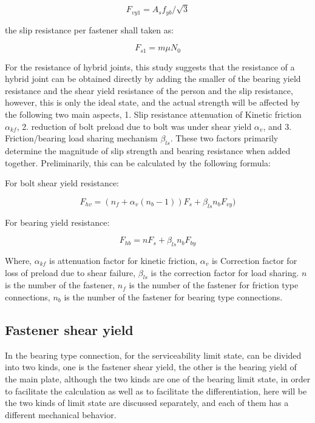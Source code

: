 \begin{equation}
    F_{vy1} = A_s f_{yb}/\sqrt{3}
\end{equation}

the slip resistance per fastener shall taken as:

\begin{equation}
    F_{s1} = m \mu N_0
\end{equation}


For the resistance of hybrid joints, this study suggests that the resistance of a hybrid joint can be obtained directly by adding the smaller of the bearing yield resistance and the shear yield resistance of the person and the slip resistance, however, this is only the ideal state, and the actual strength will be affected by the following two main aspects, 1. Slip resistance attenuation of Kinetic friction $\alpha_{kf}$, 2. reduction of bolt preload due to bolt was under shear yield $\alpha_{v}$, and 3. Friction/bearing load sharing mechanism $\beta_{ls}$. These two factors primarily determine the magnitude of slip strength and bearing resistance when added together. Preliminarily, this can be calculated by the following formula:

For bolt shear yield resistance:

\begin{equation}
    F_{hv} = (n_f + \alpha_{v}(n_b-1)) F_s + \beta_{ls} n_b F_{vy})
\end{equation}

For bearing yield resistance:

\begin{equation}
    F_{hb} = n F_s + \beta_{ls} n_b F_{by}
\end{equation}

Where, $\alpha_{kf}$ is attenuation factor for kinetic friction, $\alpha_v$ is Correction factor for loss of preload due to shear failure, $\beta_{ls}$ is the correction factor for load sharing. $n$ is the number of the fastener, $n_f$ is the number of the fastener for friction type connections, $n_b$ is the number of the fastener for bearing type connections.

\subsection{Fastener shear yield}

In the bearing type connection, for the serviceability limit state, can be divided into two kinds, one is the fastener shear yield, the other is the bearing yield of the main plate, although the two kinds are one of the bearing limit state, in order to facilitate the calculation as well as to facilitate the differentiation, here will be the two kinds of limit state are discussed separately, and each of them has a different mechanical behavior.

